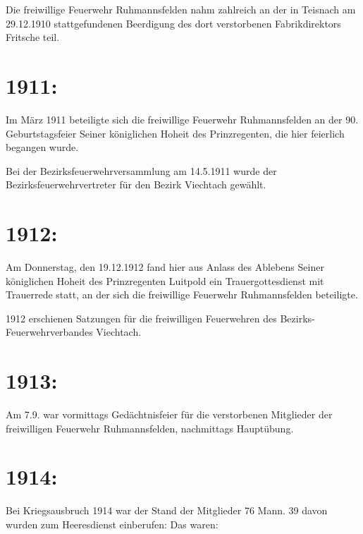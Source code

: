 \documentclass[12pt,a4paper]{book}
\begin{document}
Die freiwillige Feuerwehr Ruhmannsfelden nahm zahlreich an der in Teisnach am
29.12.1910 stattgefundenen Beerdigung des dort verstorbenen Fabrikdirektors
Fritsche teil.

\section{1911:}

Im März 1911 beteiligte sich die freiwillige Feuerwehr Ruhmannsfelden an der 90.
Geburtstagsfeier Seiner königlichen Hoheit des Prinzregenten, die hier feierlich
begangen wurde.

Bei der Bezirksfeuerwehrversammlung am 14.5.1911 wurde der
Bezirksfeuerwehrvertreter für den Bezirk Viechtach gewählt.

\section{1912:}

Am Donnerstag, den 19.12.1912 fand hier aus Anlass des Ablebens Seiner
königlichen Hoheit des Prinzregenten Luitpold ein Trauergottesdienst mit
Trauerrede statt, an der sich die freiwillige Feuerwehr Ruhmannsfelden
beteiligte.

1912 erschienen Satzungen für die freiwilligen Feuerwehren des
Bezirks-Feuerwehrverbandes Viechtach.

\section{1913:}

Am 7.9. war vormittags Gedächtnisfeier für die verstorbenen Mitglieder der
freiwilligen Feuerwehr Ruhmannsfelden, nachmittags Hauptübung.

\section{1914:}

Bei Kriegsausbruch 1914 war der Stand der Mitglieder 76 Mann. 39 davon wurden
zum Heeresdienst einberufen: Das waren:
\end{document}
